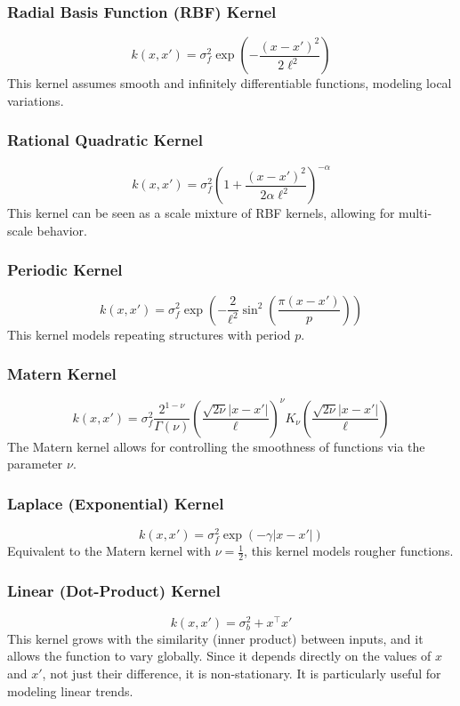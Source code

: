 \documentclass{ucdgradtaughtthesis}
\begin{document}
\subsubsection*{Radial Basis Function (RBF) Kernel}
\[
k(x, x') = \sigma_f^2 \exp\left( -\frac{(x - x')^2}{2\ell^2} \right)
\]
This kernel assumes smooth and infinitely differentiable functions, modeling local variations.


\subsubsection*{Rational Quadratic Kernel}
\[
k(x, x') = \sigma_f^2 \left( 1 + \frac{(x - x')^2}{2 \alpha \ell^2} \right)^{-\alpha}
\]
This kernel can be seen as a scale mixture of RBF kernels, allowing for multi-scale behavior.


\subsubsection*{Periodic Kernel}
\[
k(x, x') = \sigma_f^2 \exp\left( -\frac{2}{\ell^2} \sin^2\left( \frac{\pi (x - x')}{p} \right) \right)
\]
This kernel models repeating structures with period \( p \).

\subsubsection*{Matern Kernel}
\[
k(x, x') = \sigma_f^2 \frac{2^{1-\nu}}{\Gamma(\nu)} \left( \frac{\sqrt{2\nu} |x - x'|}{\ell} \right)^\nu K_\nu\left( \frac{\sqrt{2\nu} |x - x'|}{\ell} \right)
\]
The Matern kernel allows for controlling the smoothness of functions via the parameter \( \nu \).


\subsubsection*{Laplace (Exponential) Kernel}
\[
k(x, x') = \sigma_f^2 \exp\left( -\gamma |x - x'| \right)
\]
Equivalent to the Matern kernel with \( \nu = \frac{1}{2} \), this kernel models rougher functions.


\subsubsection*{Linear (Dot-Product) Kernel}
\[
k(x, x') = \sigma_b^2 + x^\top x'
\]
This kernel grows with the similarity (inner product) between inputs, and it allows the function to vary globally. Since it depends directly on the values of \( x \) and \( x' \), not just their difference, it is non-stationary. It is particularly useful for modeling linear trends.
\end{document}
